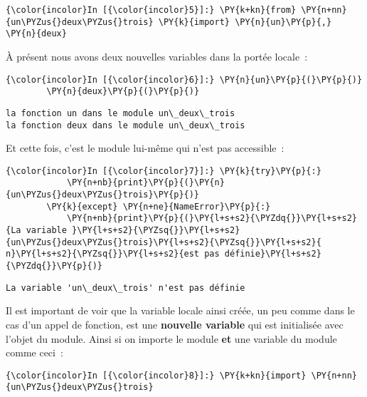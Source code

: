     \begin{Verbatim}[commandchars=\\\{\}]
{\color{incolor}In [{\color{incolor}5}]:} \PY{k+kn}{from} \PY{n+nn}{un\PYZus{}deux\PYZus{}trois} \PY{k}{import} \PY{n}{un}\PY{p}{,} \PY{n}{deux}
\end{Verbatim}


    À présent nous avons deux nouvelles variables dans la portée locale~:

    \begin{Verbatim}[commandchars=\\\{\}]
{\color{incolor}In [{\color{incolor}6}]:} \PY{n}{un}\PY{p}{(}\PY{p}{)}
        \PY{n}{deux}\PY{p}{(}\PY{p}{)}
\end{Verbatim}


    \begin{Verbatim}[commandchars=\\\{\}]
la fonction un dans le module un\_deux\_trois
la fonction deux dans le module un\_deux\_trois

    \end{Verbatim}

    Et cette fois, c'est le module lui-même qui n'est pas accessible~:

    \begin{Verbatim}[commandchars=\\\{\}]
{\color{incolor}In [{\color{incolor}7}]:} \PY{k}{try}\PY{p}{:}
            \PY{n+nb}{print}\PY{p}{(}\PY{n}{un\PYZus{}deux\PYZus{}trois}\PY{p}{)}
        \PY{k}{except} \PY{n+ne}{NameError}\PY{p}{:}
            \PY{n+nb}{print}\PY{p}{(}\PY{l+s+s2}{\PYZdq{}}\PY{l+s+s2}{La variable }\PY{l+s+s2}{\PYZsq{}}\PY{l+s+s2}{un\PYZus{}deux\PYZus{}trois}\PY{l+s+s2}{\PYZsq{}}\PY{l+s+s2}{ n}\PY{l+s+s2}{\PYZsq{}}\PY{l+s+s2}{est pas définie}\PY{l+s+s2}{\PYZdq{}}\PY{p}{)}
\end{Verbatim}


    \begin{Verbatim}[commandchars=\\\{\}]
La variable 'un\_deux\_trois' n'est pas définie

    \end{Verbatim}

    Il est important de voir que la variable locale ainsi créée, un peu
comme dans le cas d'un appel de fonction, est une \textbf{nouvelle
variable} qui est initialisée avec l'objet du module. Ainsi si on
importe le module \textbf{et} une variable du module comme ceci~:

    \begin{Verbatim}[commandchars=\\\{\}]
{\color{incolor}In [{\color{incolor}8}]:} \PY{k+kn}{import} \PY{n+nn}{un\PYZus{}deux\PYZus{}trois}
\end{Verbatim}


